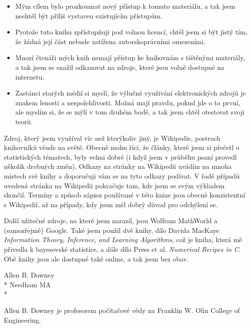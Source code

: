 \documentclass[12pt]{book}
\begin{document}
\begin{itemize}

\item Mým cílem bylo prozkoumat nový přístup k tomuto materiálu, a tak jsem nechtěl být příliš vystaven existujícím přístupům.

\item Protože tuto knihu zpřístupňuji pod volnou licencí, chtěl jsem si být jistý tím, že žádná její část nebude zatížena autorskoprávními omezeními.

\item Mnozí čtenáři mých knih nemají přístup ke knihovnám s tištěnými materiály, a tak jsem se snažil odkazovat na zdroje, které jsou volně dostupné na internetu.

\item Zastánci starých médií si myslí, že výlučné využívání elektronických zdrojů je znakem lenosti a nespolehlivosti. Možná mají pravdu, pokud jde o to první, ale myslím si, že se mýlí v tom druhém bodě, a tak jsem chtěl otestovat svoji teorii.


\end{itemize}

Zdroj, který jsem využíval víc než kterýkoliv jiný, je Wikipedie, postrach knihovníků všude na světě. Obecně mohu říci, že články, které jsem si přečetl o statistických tématech, byly velmi dobré (i když jsem v průběhu psaní provedl několik drobných změn). Odkazy na stránky na Wikipedii uvádím na mnoha místech své knihy a doporučuji vám se na tyto odkazy podívat. V řadě případů uvedená stránka na Wikipedii pokračuje tam, kde jsem se svým výkladem skončil. Termíny a způsob zápisu používané v této knize jsou obecně konzistentní s Wikipedií, až na případy, kdy jsem měl dobrý důvod pro odchýlení se.

Další užitečné zdroje, na které jsem narazil, jsou Wolfram MathWorld a (samozřejmě)
Google. Také jsem použil dvě knihy, dílo Davida MacKaye {\em Information
  Theory, Inference, and Learning Algorithms}, což je kniha, která mě přivedla k bayesovské statistice, a dále dílo Press et al. {\em
  Numerical Recipes in C}. Obě knihy jsou ale dostupné také online,
a tak jsem bez obav.

Allen B. Downey \\*
Needham MA \\*

Allen B. Downey je profesorem počítačové vědy na Franklin W. Olin College of Engineering.
\end{document}
